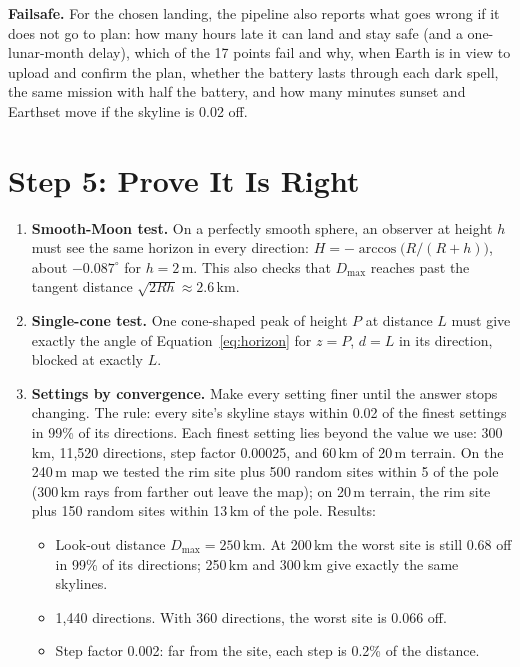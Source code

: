 \documentclass[11pt,a4paper]{article}
\begin{document}
\textbf{Failsafe.} For the chosen landing, the pipeline also reports what goes wrong if it does not go to plan: how many hours late it can land and stay safe (and a one-lunar-month delay), which of the 17 points fail and why, when Earth is in view to upload and confirm the plan, whether the battery lasts through each dark spell, the same mission with half the battery, and how many minutes sunset and Earthset move if the skyline is 0.02\textdegree{} off.

\section{Step 5: Prove It Is Right}

\begin{enumerate}
  \item \textbf{Smooth-Moon test.} On a perfectly smooth sphere, an observer at height $h$ must see the same horizon in every direction: $H = -\arccos\!\big(R/(R+h)\big)$, about $-0.087^\circ$ for $h = 2$\,m. This also checks that $D_{\max}$ reaches past the tangent distance $\sqrt{2Rh} \approx 2.6$\,km.
  \item \textbf{Single-cone test.} One cone-shaped peak of height $P$ at distance $L$ must give exactly the angle of Equation~\eqref{eq:horizon} for $z = P$, $d = L$ in its direction, blocked at exactly $L$.
  \item \textbf{Settings by convergence.} Make every setting finer until the answer stops changing. The rule: every site's skyline stays within 0.02\textdegree{} of the finest settings in 99\% of its directions. Each finest setting lies beyond the value we use: 300\,km, 11{,}520 directions, step factor 0.00025, and 60\,km of 20\,m terrain. On the 240\,m map we tested the rim site plus 500 random sites within 5\textdegree{} of the pole (300\,km rays from farther out leave the map); on 20\,m terrain, the rim site plus 150 random sites within 13\,km of the pole. Results:
  \begin{itemize}
    \item Look-out distance $D_{\max} = 250$\,km. At 200\,km the worst site is still 0.68\textdegree{} off in 99\% of its directions; 250\,km and 300\,km give exactly the same skylines.
    \item 1{,}440 directions. With 360 directions, the worst site is 0.066\textdegree{} off.
    \item Step factor 0.002: far from the site, each step is 0.2\% of the distance.

\end{itemize}
\end{enumerate}
\end{document}
